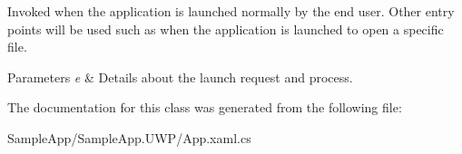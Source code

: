 Invoked when the application is launched normally by the end user. Other entry points will be used such as when the application is launched to open a specific file. 


\begin{DoxyParams}{Parameters}
{\em e} & Details about the launch request and process.\\
\hline
\end{DoxyParams}


The documentation for this class was generated from the following file\+:\begin{DoxyCompactItemize}
\item 
Sample\+App/\+Sample\+App.\+U\+W\+P/App.\+xaml.\+cs\end{DoxyCompactItemize}
